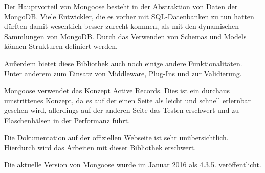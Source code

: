 Der Hauptvorteil von Mongoose besteht in der Abstraktion von Daten der MongoDB. Viele Entwickler, die es vorher mit SQL-Datenbanken zu tun hatten dürften damit wesentlich besser zurecht kommen, als mit den dynamischen Sammlungen von MongoDB. Durch das Verwenden von Schemas und Models können Strukturen definiert werden.

Außerdem bietet diese Bibliothek auch noch einige andere Funktionalitäten. Unter anderem zum Einsatz von Middleware, Plug-Ins und zur Validierung.

Mongoose verwendet das Konzept Active Records. Dies ist ein durchaus umstrittenes Konzept, da es auf der einen Seite als leicht und schnell erlernbar gesehen wird, allerdings auf der anderen Seite das Testen erschwert und zu Flaschenhälsen in der Performanz führt.

Die Dokumentation auf der offiziellen Webseite ist sehr unübersichtlich. Hierdurch wird das Arbeiten mit dieser Bibliothek erschwert.

Die aktuelle Version von Mongoose wurde im Januar 2016 als 4.3.5. veröffentlicht.

